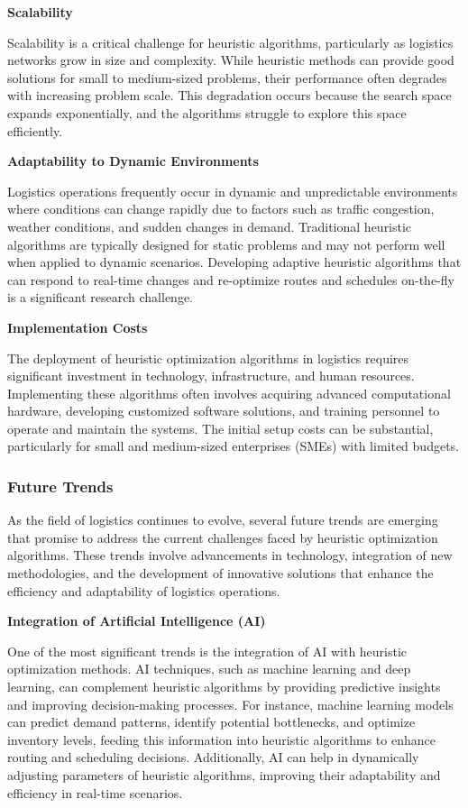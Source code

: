 \documentclass{article}
\begin{document}
    \textbf{Scalability}

    Scalability is a critical challenge for heuristic algorithms, particularly as logistics networks grow in size and complexity. While heuristic methods can provide good solutions for small to medium-sized problems, their performance often degrades with increasing problem scale. This degradation occurs because the search space expands exponentially, and the algorithms struggle to explore this space efficiently. \cite{Puri2023}

    \textbf{Adaptability to Dynamic Environments}

    Logistics operations frequently occur in dynamic and unpredictable environments where conditions can change rapidly due to factors such as traffic congestion, weather conditions, and sudden changes in demand. Traditional heuristic algorithms are typically designed for static problems and may not perform well when applied to dynamic scenarios. Developing adaptive heuristic algorithms that can respond to real-time changes and re-optimize routes and schedules on-the-fly is a significant research challenge. \cite{Ochelska2021}

    \textbf{Implementation Costs}

    The deployment of heuristic optimization algorithms in logistics requires significant investment in technology, infrastructure, and human resources. Implementing these algorithms often involves acquiring advanced computational hardware, developing customized software solutions, and training personnel to operate and maintain the systems. The initial setup costs can be substantial, particularly for small and medium-sized enterprises (SMEs) with limited budgets. \cite{Puri2023}


    \subsubsection{Future Trends}\label{subsec:future-trends}

    As the field of logistics continues to evolve, several future trends are emerging that promise to address the current challenges faced by heuristic optimization algorithms. These trends involve advancements in technology, integration of new methodologies, and the development of innovative solutions that enhance the efficiency and adaptability of logistics operations.

    \textbf{Integration of Artificial Intelligence (AI)}

    One of the most significant trends is the integration of AI with heuristic optimization methods. AI techniques, such as machine learning and deep learning, can complement heuristic algorithms by providing predictive insights and improving decision-making processes. For instance, machine learning models can predict demand patterns, identify potential bottlenecks, and optimize inventory levels, feeding this information into heuristic algorithms to enhance routing and scheduling decisions. Additionally, AI can help in dynamically adjusting parameters of heuristic algorithms, improving their adaptability and efficiency in real-time scenarios. \cite{Puri2023}
\end{document}
